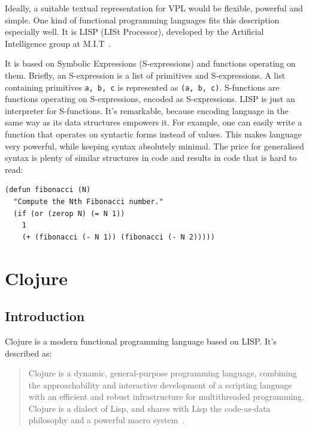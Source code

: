 \documentclass[11pt]{scrartcl}
\begin{document}
Ideally, a suitable textual representation for VPL would be flexible, powerful
and simple.
One kind of functional programming languages fits this description especially
well.
It is LISP (LISt Processor), developed by the Artificial Intelligence group at
M.I.T~\cite{recursive}.

It is based on Symbolic Expressions (S-expressions) and functions operating on
them.
Briefly, an S-expression is a list of primitives and S-expressions.
A list containing primitives \lstinline|a, b, c| is represented as \lstinline|(a, b, c)|.
S-functions are functions operating on S-expressions, encoded as S-expressions.
LISP is just an interpreter for S-functions.
It’s remarkable, because encoding language in the same way as its data
structures empowers it.
For example, one can easily write a function that operates on syntactic forms
instead of values.
This makes language very powerful, while keeping syntax absolutely minimal.
The price for generalised syntax is plenty of similar structures in code and
results in code that is hard to read:

\begin{lstlisting}
(defun fibonacci (N)
  "Compute the Nth Fibonacci number."
  (if (or (zerop N) (= N 1))
    1
    (+ (fibonacci (- N 1)) (fibonacci (- N 2)))))
\end{lstlisting}

\section{Clojure}
\subsection{Introduction}
Clojure is a modern functional programming language based on LISP. It’s
described as:

\blockquote{Clojure is a dynamic, general-purpose
  programming language, combining the approachability and interactive
  development of a scripting language with an efficient and robust
  infrastructure for multithreaded programming. Clojure is a dialect of Lisp,
  and shares with Lisp the code-as-data philosophy and a powerful macro
  system~\cite{clojure_website}.}
\end{document}
